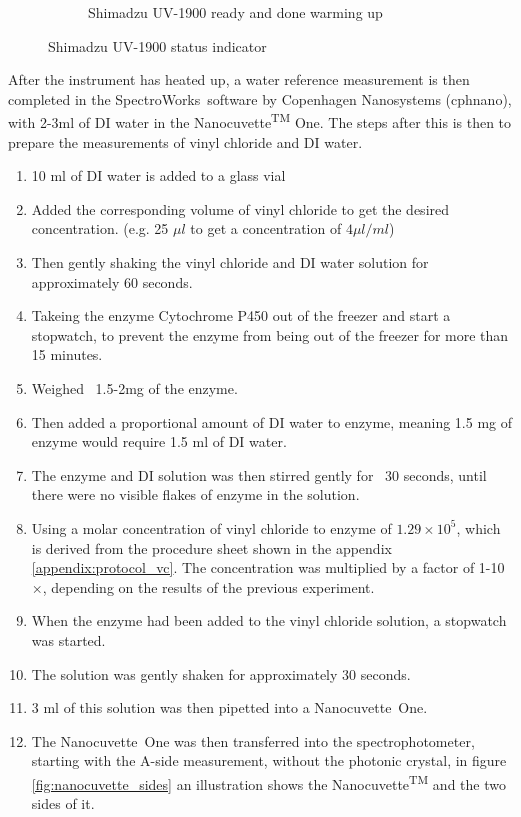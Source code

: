 \documentclass{article}
\begin{document}
\begin{figure}[H]
\begin{subfigure}[b]{0.48\textwidth}
       \caption{Shimadzu UV-1900 ready and done warming up}
       \label{fig:shimadzu_ready}
    \end{subfigure}
    \caption{Shimadzu UV-1900 status indicator}
    \label{fig:shimadzu_status}
\end{figure}

After the instrument has heated up, a water reference measurement is then completed in the SpectroWorks\texttrademark\ software by Copenhagen Nanosystems (cphnano), with 2-3ml of DI water in the Nanocuvette\textsuperscript{TM} One.
The steps after this is then to prepare the measurements of vinyl chloride and DI water.

\begin{enumerate}
    \item 10 ml of DI water is added to a glass vial
    \item Added the corresponding volume of vinyl chloride to get the desired concentration. (e.g. 25 $\mu l$ to get a concentration of $ 4 \mu l / ml $)
    \item Then gently shaking the vinyl chloride and DI water solution for approximately 60 seconds.
    \item Takeing the enzyme Cytochrome P450 out of the freezer and start a stopwatch, to prevent the enzyme from being out of the freezer for more than 15 minutes.
    \item Weighed ~1.5-2mg of the enzyme.
    \item Then added a proportional amount of DI water to enzyme, meaning 1.5 mg of enzyme would require 1.5 ml of DI water.
    \item The enzyme and DI solution was then stirred gently for ~30 seconds, until there were no visible flakes of enzyme in the solution.
    \item Using a molar concentration of vinyl chloride to enzyme of $1.29 \times 10^5$, which is derived from the procedure sheet shown in the appendix \ref{appendix:protocol_vc}. The concentration was multiplied by a factor of 1-10$\times$, depending on the results of the previous experiment.
    \item When the enzyme had been added to the vinyl chloride solution, a stopwatch was started.
    \item The solution was gently shaken for approximately 30 seconds.
    \item 3 ml of this solution was then pipetted into a Nanocuvette\texttrademark\ One.
    \item The Nanocuvette\texttrademark\ One was then transferred into the spectrophotometer, starting with the A-side measurement, without the photonic crystal, in figure \ref{fig:nanocuvette_sides} an illustration shows the Nanocuvette\textsuperscript{TM} and the two sides of it.\label{step:measurement_start}


\end{enumerate}
\end{document}
